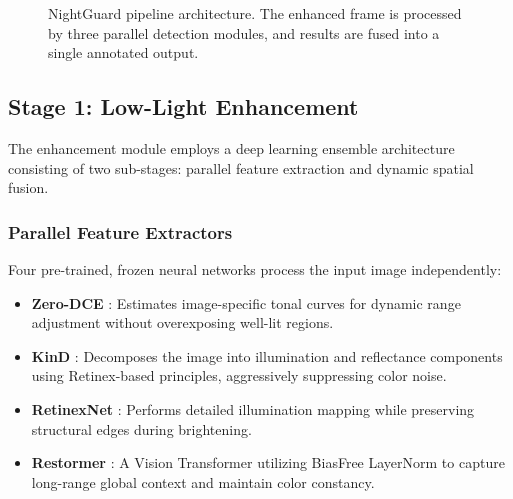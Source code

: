 \documentclass[conference]{IEEEtran}
\begin{document}
\begin{figure}[htbp]
\centerline{}
\caption{NightGuard pipeline architecture. The enhanced frame is processed by three parallel detection modules, and results are fused into a single annotated output.}
\label{fig:architecture}
\end{figure}

\subsection{Stage 1: Low-Light Enhancement}

The enhancement module employs a deep learning ensemble architecture consisting of two sub-stages: parallel feature extraction and dynamic spatial fusion.

\subsubsection{Parallel Feature Extractors}

Four pre-trained, frozen neural networks process the input image independently:

\begin{itemize}
\item \textbf{Zero-DCE} \cite{b8}: Estimates image-specific tonal curves for dynamic range adjustment without overexposing well-lit regions.
\item \textbf{KinD} \cite{b9}: Decomposes the image into illumination and reflectance components using Retinex-based principles, aggressively suppressing color noise.
\item \textbf{RetinexNet} \cite{b10}: Performs detailed illumination mapping while preserving structural edges during brightening.
\item \textbf{Restormer} \cite{b11}: A Vision Transformer utilizing BiasFree LayerNorm to capture long-range global context and maintain color constancy.
\end{itemize}
\end{document}
